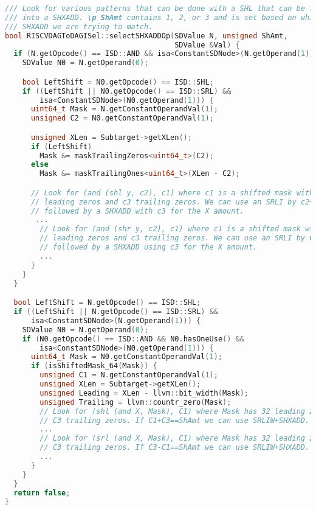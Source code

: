 \begin{lstlisting}[language=C++, caption={Implementation of the ComplexPattern for "sh1add\_op"}]
/// Look for various patterns that can be done with a SHL that can be folded
/// into a SHXADD. \p ShAmt contains 1, 2, or 3 and is set based on which
/// SHXADD we are trying to match.
bool RISCVDAGToDAGISel::selectSHXADDOp(SDValue N, unsigned ShAmt,
                                       SDValue &Val) {
  if (N.getOpcode() == ISD::AND && isa<ConstantSDNode>(N.getOperand(1))) {
    SDValue N0 = N.getOperand(0);

    bool LeftShift = N0.getOpcode() == ISD::SHL;
    if ((LeftShift || N0.getOpcode() == ISD::SRL) &&
        isa<ConstantSDNode>(N0.getOperand(1))) {
      uint64_t Mask = N.getConstantOperandVal(1);
      unsigned C2 = N0.getConstantOperandVal(1);

      unsigned XLen = Subtarget->getXLen();
      if (LeftShift)
        Mask &= maskTrailingZeros<uint64_t>(C2);
      else
        Mask &= maskTrailingOnes<uint64_t>(XLen - C2);

      // Look for (and (shl y, c2), c1) where c1 is a shifted mask with no
      // leading zeros and c3 trailing zeros. We can use an SRLI by c2+c3
      // followed by a SHXADD with c3 for the X amount.
       ...
        // Look for (and (shr y, c2), c1) where c1 is a shifted mask with c2
        // leading zeros and c3 trailing zeros. We can use an SRLI by C3
        // followed by a SHXADD using c3 for the X amount.
        ...
      }
    }
  }

  bool LeftShift = N.getOpcode() == ISD::SHL;
  if ((LeftShift || N.getOpcode() == ISD::SRL) &&
      isa<ConstantSDNode>(N.getOperand(1))) {
    SDValue N0 = N.getOperand(0);
    if (N0.getOpcode() == ISD::AND && N0.hasOneUse() &&
        isa<ConstantSDNode>(N0.getOperand(1))) {
      uint64_t Mask = N0.getConstantOperandVal(1);
      if (isShiftedMask_64(Mask)) {
        unsigned C1 = N.getConstantOperandVal(1);
        unsigned XLen = Subtarget->getXLen();
        unsigned Leading = XLen - llvm::bit_width(Mask);
        unsigned Trailing = llvm::countr_zero(Mask);
        // Look for (shl (and X, Mask), C1) where Mask has 32 leading zeros and
        // C3 trailing zeros. If C1+C3==ShAmt we can use SRLIW+SHXADD.
        ...
        // Look for (srl (and X, Mask), C1) where Mask has 32 leading zeros and
        // C3 trailing zeros. If C3-C1==ShAmt we can use SRLIW+SHXADD.
        ...
      }
    }
  }
  return false;
}
\end{lstlisting}


